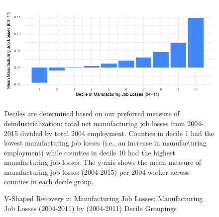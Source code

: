 \documentclass[]{AEA}
\begin{document}
\begin{figure} \label{vShapePlot1}
\caption{V-Shaped Recovery in Manufacturing Job Losses: Manufacturing Job Losses (2004-2011) by (2004-2011) Decile Groupings}

\begin{center}\includegraphics{Final-Draft_files/figure-latex/unnamed-chunk-10-1} \end{center}



\FloatBarrier
\begin{figurenotes}
Deciles are determined based on our preferred measure of deindustrialization: total net manufacturing job losses from 2004-2015 divided by total 2004 employment. Counties in decile 1 had the lowest manufacturing job losses (i.e., an increase in manufacturing employment) while counties in decile 10 had the highest manufacturing job losses. The y-axis shows the mean measure of manufacturing job losses (2004-2015) per 2004 worker across counties in each decile group.
\end{figurenotes}
\end{figure}
\end{document}
